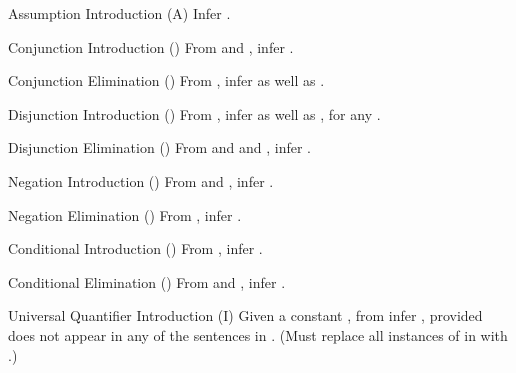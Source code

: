\begin{infrule}

 \item[Assumption Introduction (A)] Infer   \p{\seq{\phi}
  {\phi}}.

 \item[Conjunction Introduction (\conjI)] From  and 
  , infer .


 \item[Conjunction Elimination (\conjE)] From , 
  infer  as well as .

 \item[Disjunction Introduction (\disjI)] From , infer 
   as well as , for 
  any .

 \item[Disjunction Elimination (\disjE)] From  and
   and , infer 
  .

 \item[Negation Introduction (\negI)] From  and , infer .

 \item[Negation Elimination (\negE)] From \p{\seq{\Lambda}{\lnot\lnot \phi}}, 
  infer \p{\seq{\Lambda}{\phi}}.

 \item[Conditional Introduction (\condI)] From , infer .
 
 \item[Conditional Elimination (\condE)] From  and , infer .


 \item[Universal Quantifier Introduction (\p{\lforall}I)] Given a constant 
  \p{\kappa}, from \p{\seq{\Lambda}
   {\phi(\kappa)}} infer \mbox{\p{\seq{\Lambda}{\lforall\upsilon
  \phi(\upsilon)}}}, provided \p{\kappa} does not appear in any of the sentences 
  in \p{\Lambda}. (Must replace all instances of \p{\kappa} in \p{\phi(\kappa)
  } with \p{\upsilon}.) 


\end{infrule}
